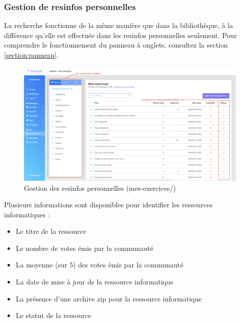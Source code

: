 \subsubsection{Gestion de \glspl{resinfo} personnelles}
\label{section:gestionResInfo}

La recherche fonctionne de la même manière que dans la bibliothèque, à la différence qu'elle est effectuée dans les \glspl{resinfo} personnelles seulement. Pour comprendre le fonctionnement du panneau à onglets, consultez la section \ref{section:panneau}.

\begin{figure}[H]
    \includegraphics[width=\textwidth,height=\textheight,keepaspectratio]{images/client/gestion-exercices.png}
    \centering
    \caption[SourceCode : gestion des \glspl{resinfo} personnelles]{Gestion des \glspl{resinfo} personnelles (mes-exercices/)}
\end{figure}

Plusieurs informations sont disponibles pour identifier les ressources informatiques :

\begin{itemize}
    \item Le titre de la ressource
    \item Le nombre de votes émis par la communauté
    \item La moyenne (sur 5) des votes émis par la communauté
    \item La date de mise à jour de la ressource informatique
    \item La présence d'une archive zip pour la ressource informatique
    \item Le statut de la ressource
\end{itemize}


\label{section:statutDuneRessource}

